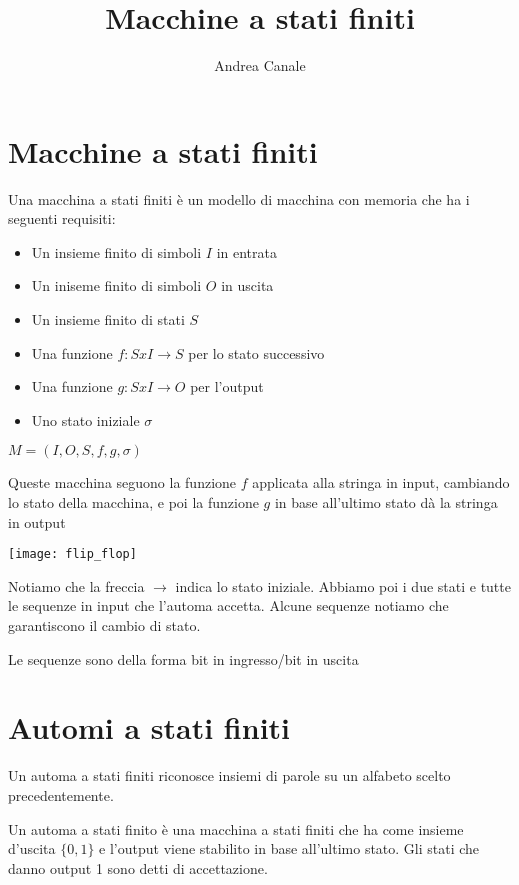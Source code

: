 \documentclass[a4paper, 10pt]{article}
\title{Macchine a stati finiti}
\author{Andrea Canale}
\begin{document}
	\maketitle
	\tableofcontents
	
\section{Macchine a stati finiti}

Una macchina a stati finiti è un modello di macchina con memoria che ha i seguenti requisiti:

\begin{itemize}
	\item Un insieme finito di simboli $I$ in entrata
	\item Un iniseme finito di simboli $O$ in uscita
	\item Un insieme finito di stati $S$
	\item Una funzione $f: S x I \rightarrow S$ per lo stato successivo
	\item Una funzione $g: S x I \rightarrow O$ per l'output
	\item Uno stato iniziale $\sigma$
\end{itemize}

$M=(I, O, S, f, g, \sigma)$

Queste macchina seguono la funzione $f$ applicata alla stringa in input, cambiando lo stato della macchina, e poi la funzione $g$ in base all'ultimo stato dà la stringa in output

\texttt{[image: flip\_flop]}

Notiamo che la freccia $\rightarrow$ indica lo stato iniziale. Abbiamo poi i due stati e tutte le sequenze in input che l'automa accetta. Alcune sequenze notiamo che garantiscono il cambio di stato.

Le sequenze sono della forma bit in ingresso/bit in uscita

\section{Automi a stati finiti}

Un automa a stati finiti riconosce insiemi di parole su un alfabeto scelto precedentemente.

Un automa a stati finito è una macchina a stati finiti che ha come insieme d'uscita $\{0, 1\}$ e l'output viene stabilito in base all'ultimo stato. Gli stati che danno output 1 sono detti di accettazione.
\end{document}

